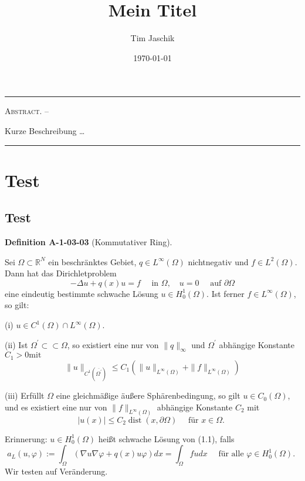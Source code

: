 \documentclass[10pt, letterpaper]{article}
\title{Mein Titel}
\author{Tim Jaschik}
\date{\today}
\renewenvironment{abstract}
  {
    \begin{adjustwidth}{1.5cm}{1.5cm}
    \small
    \textsc{Abstract. –}%
  }
  {
    \end{adjustwidth}
  }
\newcommand{\CustomHeading}[3]{%
  \par\medskip\noindent%
  \textbf{#1 #2} \textnormal{(#3)}.\enskip%
}
\newenvironment{DEF}[2]{\CustomHeading{Definition}{#1}{#2}}{}
\begin{document}
\maketitle
\rule{\textwidth}{0.5pt}
\begin{abstract}
Kurze Beschreibung …
\end{abstract}
\rule{\textwidth}{0.5pt}
\vspace{0.5cm}

\tableofcontents

\pagebreak

\section{Test}

\subsection{Test}


\begin{DEF}{A-1-03-03}{Kommutativer Ring}
Sei $\Omega \subset \mathbb{R}^{N}$ ein beschränktes Gebiet, $q \in L^{\infty}(\Omega)$ nichtnegativ und $f \in L^{2}(\Omega)$. Dann hat das Dirichletproblem
$$
-\Delta u+q(x) u=f \quad \text { in } \Omega, \quad u=0 \quad \text { auf } \partial \Omega
$$
eine eindeutig bestimmte schwache Lösung $u \in H_{0}^{1}(\Omega)$. Ist ferner $f \in L^{\infty}(\Omega)$, so gilt:

(i) $u \in C^{1}(\Omega) \cap L^{\infty}(\Omega)$.

(ii) Ist $\Omega^{\prime} \subset \subset \Omega$, so existiert eine nur von $\|q\|_{\infty}$ und $\Omega^{\prime}$ abhängige Konstante $C_{1}>0 \mathrm{mit}$
$$
\|u\|_{C^{1}\left(\overline{\Omega^{\prime}}\right)} \leq C_{1}\left(\|u\|_{L^{\infty}(\Omega)}+\|f\|_{L^{\infty}(\Omega)}\right)
$$

(iii) Erfüllt $\Omega$ eine gleichmäßige äußere Sphärenbedingung, so gilt $u \in C_{0}(\Omega)$, und es existiert eine nur von $\|f\|_{L^{\infty}(\Omega)}$ abhängige Konstante $C_{2}$ mit
$$
|u(x)| \leq C_{2} \operatorname{dist}(x, \partial \Omega) \quad \text { für } x \in \Omega \text {. }
$$

Erinnerung: $u \in H_{0}^{1}(\Omega)$ heißt schwache Lösung von (1.1), falls
$$
a_{L}(u, \varphi):=\int_{\Omega}(\nabla u \nabla \varphi+q(x) u \varphi) d x=\int_{\Omega} f u d x \quad \text { für alle } \varphi \in H_{0}^{1}(\Omega) \text {. }
$$
Wir testen auf Veränderung.
\end{DEF}
\end{document}
